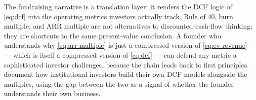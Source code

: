 The fundraising narrative is a translation layer: it renders the DCF logic of \cref{eq:dcf}
into the operating metrics investors actually track. Rule of 40, burn multiple, and ARR
multiple are not alternatives to discounted-cash-flow thinking; they are shortcuts to the
same present-value conclusion. A founder who understands why \cref{eq:arr-multiple} is just
a compressed version of \cref{eq:ev-revenue} --- which is itself a compressed version of
\cref{eq:dcf} --- can defend any metric a sophisticated investor challenges, because the
chain leads back to first principles. \textcite{metrick2021venture} document how institutional
investors build their own DCF models alongside the multiples, using the gap between the two
as a signal of whether the founder understands their own business.
